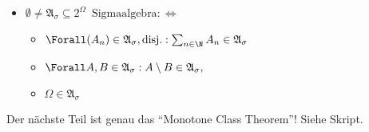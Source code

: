 \begin{solution}
\begin{itemize}
  \item $\emptyset \neq \mathfrak{A}_\sigma \subseteq 2^\Omega \enspace \text{Sigmaalgebra} : \Leftrightarrow$
  \begin{itemize}
    \item $\Forall (A_n) \in \mathfrak{A}_\sigma, \text{disj.}: \sum_{n \in \N} A_n \in \mathfrak{A}_\sigma$
    \item $\Forall A, B \in \mathfrak{A}_\sigma: A \setminus B \in \mathfrak{A}_\sigma,$
    \item $\Omega \in \mathfrak{A}_\sigma$
  \end{itemize}

\end{itemize}

Der nächste Teil ist genau das \enquote{Monotone Class Theorem}! Siehe Skript.

\end{solution}

